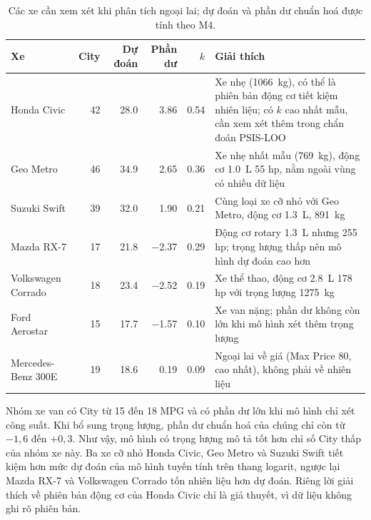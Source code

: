 \documentclass[12pt,a4paper]{report}
\begin{document}
\begin{table}[tp]
  \centering
  \small
  \caption{Các xe cần xem xét khi phân tích ngoại lai; dự đoán và phần dư chuẩn
    hoá được tính theo M4.}
  \label{tab:outliers}
  \begin{tabular}{lrrrr>{\raggedright\arraybackslash}p{6.4cm}}
    \toprule
    Xe & City & Dự đoán & Phần dư & $k$ & Giải thích \\
    \midrule
    Honda Civic        & 42 & \num{28.0} & \num{3.86}  & \num{0.54}
      & Xe nhẹ (\SI{1066}{kg}), có thể là phiên bản động cơ tiết kiệm nhiên liệu; có $k$ cao nhất mẫu, cần xem xét thêm trong chẩn đoán PSIS-LOO \\
    Geo Metro          & 46 & \num{34.9} & \num{2.65}  & \num{0.36}
      & Xe nhẹ nhất mẫu (\SI{769}{kg}), động cơ \SI{1.0}{L} 55 hp, nằm ngoài vùng có nhiều dữ liệu \\
    Suzuki Swift       & 39 & \num{32.0} & \num{1.90}  & \num{0.21}
      & Cùng loại xe cỡ nhỏ với Geo Metro, động cơ \SI{1.3}{L}, \SI{891}{kg} \\
    Mazda RX-7         & 17 & \num{21.8} & \num{-2.37} & \num{0.29}
      & Động cơ rotary \SI{1.3}{L} nhưng 255 hp; trọng lượng thấp nên mô hình dự đoán cao hơn \\
    Volkswagen Corrado & 18 & \num{23.4} & \num{-2.52} & \num{0.19}
      & Xe thể thao, động cơ \SI{2.8}{L} 178 hp với trọng lượng \SI{1275}{kg} \\
    Ford Aerostar      & 15 & \num{17.7} & \num{-1.57} & \num{0.10}
      & Xe van nặng; phần dư không còn lớn khi mô hình xét thêm trọng lượng \\
    Mercedes-Benz 300E & 19 & \num{18.6} & \num{0.19}  & \num{0.09}
      & Ngoại lai về giá (Max Price 80, cao nhất), không phải về nhiên liệu \\
    \bottomrule
  \end{tabular}
\end{table}

Nhóm xe van có City từ 15 đến 18 MPG và có phần dư lớn khi mô hình chỉ xét công
suất. Khi bổ sung trọng lượng, phần dư chuẩn hoá của chúng chỉ còn từ
$-1{,}6$ đến $+0{,}3$. Như vậy, mô hình có trọng lượng mô tả tốt hơn chỉ số
City thấp của nhóm xe này. Ba xe cỡ
nhỏ Honda Civic, Geo Metro và Suzuki Swift tiết kiệm hơn mức dự đoán của mô hình
tuyến tính trên thang logarit, ngược lại Mazda RX-7 và Volkswagen Corrado tốn nhiên liệu hơn dự
đoán. Riêng lời giải thích về phiên bản động cơ của Honda Civic chỉ là giả
thuyết, vì dữ liệu không ghi rõ phiên bản.
\end{document}
